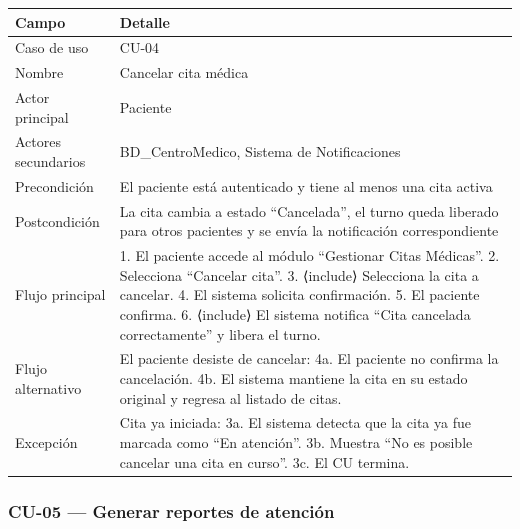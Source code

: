 \documentclass[11pt,a4paper]{article}
\begin{document}
	\begin{longtable}{p{} p{} }
		
		
		\toprule
		\textbf{Campo} &
		\textbf{Detalle}  \\
		\midrule
		\endhead
		
		Caso de uso & CU-04 \\
		Nombre & Cancelar cita médica \\
		Actor principal & Paciente \\
		Actores secundarios & BD\_CentroMedico, Sistema de Notificaciones \\
		Precondición & El paciente está autenticado y tiene al menos una cita activa \\
		Postcondición & La cita cambia a estado ``Cancelada'', el turno queda liberado para otros pacientes y se envía la notificación correspondiente \\
		Flujo principal & 1. El paciente accede al módulo ``Gestionar Citas Médicas''. 2. Selecciona ``Cancelar cita''. 3. ⟨include⟩ Selecciona la cita a cancelar. 4. El sistema solicita confirmación. 5. El paciente confirma. 6. ⟨include⟩ El sistema notifica ``Cita cancelada correctamente'' y libera el turno. \\
		Flujo alternativo & El paciente desiste de cancelar: 4a. El paciente no confirma la cancelación. 4b. El sistema mantiene la cita en su estado original y regresa al listado de citas. \\
		Excepción & Cita ya iniciada: 3a. El sistema detecta que la cita ya fue marcada como ``En atención''. 3b. Muestra ``No es posible cancelar una cita en curso''. 3c. El CU termina. \\
		
		\bottomrule
	\end{longtable}
	
	\subsubsection{CU-05 --- Generar reportes de atención}
	
\end{document}
